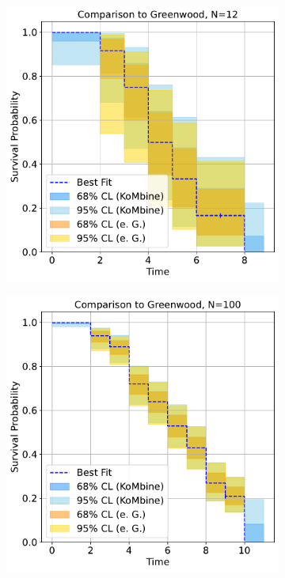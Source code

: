 \documentclass[article]{jss}
\begin{document}
\begin{figure}
\centering
\begin{subfigure}[t]{0.49\textwidth}
  \centering
  \includegraphics[width=\linewidth]{comparison_to_greenwood_small_n.pdf}
  \caption{\label{fig:compare-to-greenwood-small-n}}
\end{subfigure}
\begin{subfigure}[t]{0.49\textwidth}
  \centering
  \includegraphics[width=\linewidth]{comparison_to_greenwood_large_n.pdf}

\end{subfigure}
\end{figure}
\end{document}

